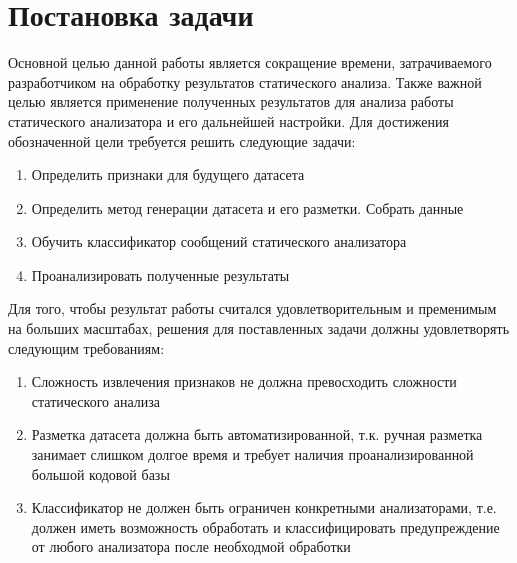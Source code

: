 \chapter{Постановка задачи}
\label{sec:Chapter1} 

Основной целью данной работы является сокращение времени, затрачиваемого разработчиком на обработку результатов статического анализа. Также важной целью является применение полученных результатов для анализа работы статического анализатора и его дальнейшей настройки. Для достижения обозначенной цели требуется решить следующие задачи:

\begin{enumerate}
    \item Определить признаки для будущего датасета
    \item Определить метод генерации датасета и его разметки. Собрать данные
    \item Обучить классификатор сообщений статического анализатора
    \item Проанализировать полученные результаты
\end{enumerate}

Для того, чтобы результат работы считался удовлетворительным и пременимым на больших масштабах, решения для поставленных задачи должны удовлетворять следующим требованиям:

\begin{enumerate}
    \item Сложность извлечения признаков не должна превосходить сложности статического анализа
    \item Разметка датасета должна быть автоматизированной, т.к. ручная разметка занимает слишком долгое время и требует наличия проанализированной большой кодовой базы \cite{Ayewah2010TheGF}
    \item Классификатор не должен быть ограничен конкретными анализаторами, т.е. должен иметь возможность обработать и классифицировать предупреждение от любого анализатора после необходмой обработки
\end{enumerate}

\newpage